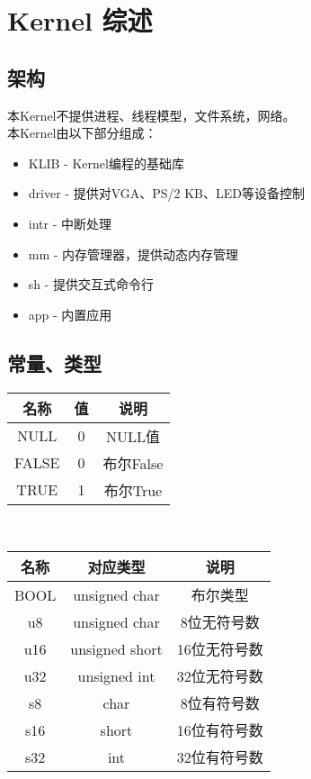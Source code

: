 %
%
%
%
%
%
%
%
\chapter{Kernel 综述}
\section{架构}
本Kernel不提供进程、线程模型，文件系统，网络。\\
本Kernel由以下部分组成：
\begin{itemize}
    \item KLIB - Kernel编程的基础库
    \item driver - 提供对VGA、PS/2 KB、LED等设备控制
    \item intr - 中断处理
    \item mm - 内存管理器，提供动态内存管理
    \item sh - 提供交互式命令行
    \item app - 内置应用
\end{itemize}
\section{常量、类型}
\begin{tabular}{|c|c|c|}
    \hline
    名称 & 值 & 说明\\\hline
    NULL & 0 & NULL值\\\hline
    FALSE & 0 & 布尔False\\\hline
    TRUE & 1 & 布尔True\\\hline
\end{tabular}\\
\begin{tabular}{|c|c|c|}
    \hline
    名称 & 对应类型 & 说明\\\hline
    BOOL & unsigned char & 布尔类型\\\hline
    u8 & unsigned char & 8位无符号数\\\hline
    u16 & unsigned short & 16位无符号数\\\hline
    u32 & unsigned int & 32位无符号数\\\hline
    s8 & char & 8位有符号数\\\hline
    s16 & short & 16位有符号数\\\hline
    s32 & int & 32位有符号数\\\hline
\end{tabular}